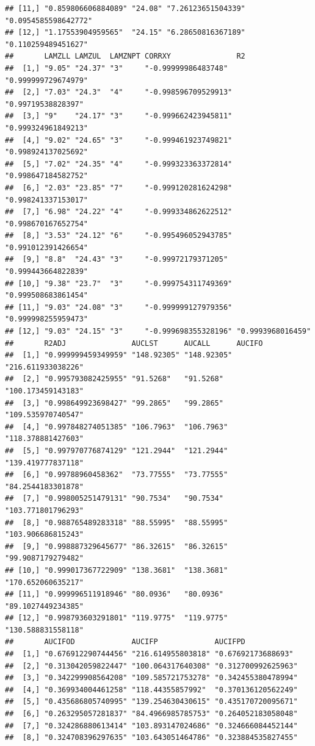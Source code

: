 \documentclass[]{krantz}
\theoremstyle{definition}
\theoremstyle{definition}
\theoremstyle{definition}
\theoremstyle{remark}
\begin{document}
\begin{verbatim}
## [11,] "0.859806606884089" "24.08" "7.26123651504339" "0.0954585598642772"
## [12,] "1.17553904959565"  "24.15" "6.28650816367189" "0.110259489451627" 
##       LAMZLL LAMZUL  LAMZNPT CORRXY               R2                 
##  [1,] "9.05" "24.37" "3"     "-0.99999986483748"  "0.999999729674979"
##  [2,] "7.03" "24.3"  "4"     "-0.998596709529913" "0.99719538828397" 
##  [3,] "9"    "24.17" "3"     "-0.999662423945811" "0.999324961849213"
##  [4,] "9.02" "24.65" "3"     "-0.999461923749821" "0.998924137025692"
##  [5,] "7.02" "24.35" "4"     "-0.999323363372814" "0.998647184582752"
##  [6,] "2.03" "23.85" "7"     "-0.999120281624298" "0.998241337153017"
##  [7,] "6.98" "24.22" "4"     "-0.999334862622512" "0.998670167652754"
##  [8,] "3.53" "24.12" "6"     "-0.995496052943785" "0.991012391426654"
##  [9,] "8.8"  "24.43" "3"     "-0.99972179371205"  "0.999443664822839"
## [10,] "9.38" "23.7"  "3"     "-0.999754311749369" "0.999508683861454"
## [11,] "9.03" "24.08" "3"     "-0.999999127979356" "0.999998255959473"
## [12,] "9.03" "24.15" "3"     "-0.999698355328196" "0.9993968016459"  
##       R2ADJ               AUCLST      AUCALL      AUCIFO            
##  [1,] "0.999999459349959" "148.92305" "148.92305" "216.611933038226"
##  [2,] "0.995793082425955" "91.5268"   "91.5268"   "100.173459143183"
##  [3,] "0.998649923698427" "99.2865"   "99.2865"   "109.535970740547"
##  [4,] "0.997848274051385" "106.7963"  "106.7963"  "118.378881427603"
##  [5,] "0.997970776874129" "121.2944"  "121.2944"  "139.419777837118"
##  [6,] "0.99788960458362"  "73.77555"  "73.77555"  "84.2544183301878"
##  [7,] "0.998005251479131" "90.7534"   "90.7534"   "103.771801796293"
##  [8,] "0.988765489283318" "88.55995"  "88.55995"  "103.906686815243"
##  [9,] "0.998887329645677" "86.32615"  "86.32615"  "99.9087179279482"
## [10,] "0.999017367722909" "138.3681"  "138.3681"  "170.652060635217"
## [11,] "0.999996511918946" "80.0936"   "80.0936"   "89.1027449234385"
## [12,] "0.998793603291801" "119.9775"  "119.9775"  "130.588831558118"
##       AUCIFOD             AUCIFP             AUCIFPD            
##  [1,] "0.676912290744456" "216.614955803818" "0.67692173688693" 
##  [2,] "0.313042059822447" "100.064317640308" "0.312700992625963"
##  [3,] "0.342299908564208" "109.585721753278" "0.342455380478994"
##  [4,] "0.369934004461258" "118.44355857992"  "0.370136120562249"
##  [5,] "0.435686805740995" "139.254630430615" "0.435170720095671"
##  [6,] "0.263295057281837" "84.4966985785753" "0.264052183058048"
##  [7,] "0.324286880613414" "103.893147024686" "0.324666084452144"
##  [8,] "0.324708396297635" "103.643051464786" "0.323884535827455"

\end{verbatim}
\end{document}
